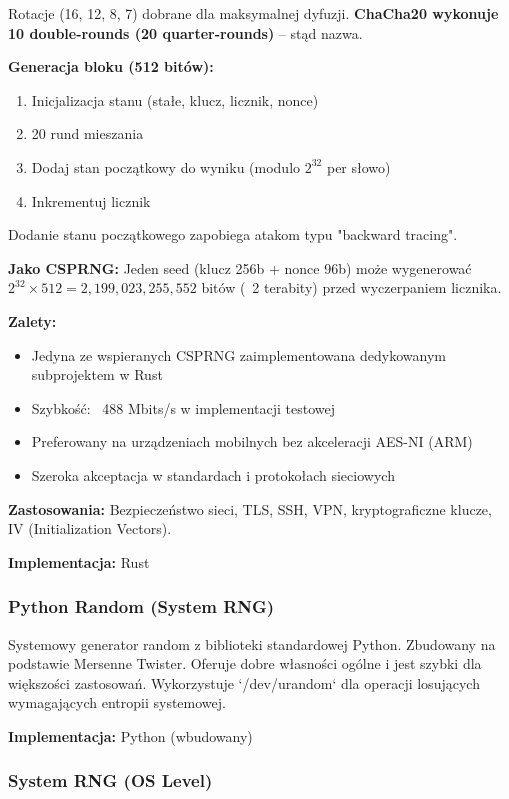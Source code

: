 \documentclass[12pt,a4paper]{article}
\begin{document}
Rotacje (16, 12, 8, 7) dobrane dla maksymalnej dyfuzji. \textbf{ChaCha20 wykonuje 10 double-rounds (20 quarter-rounds)} – stąd nazwa.

\textbf{Generacja bloku (512 bitów):}
\begin{enumerate}
    \item Inicjalizacja stanu (stałe, klucz, licznik, nonce)
    \item 20 rund mieszania
    \item Dodaj stan początkowy do wyniku (modulo $2^{32}$ per słowo)
    \item Inkrementuj licznik
\end{enumerate}

Dodanie stanu początkowego zapobiega atakom typu "backward tracing".

\textbf{Jako CSPRNG:} Jeden seed (klucz 256b + nonce 96b) może wygenerować $2^{32} \times 512 = 2{,}199{,}023{,}255{,}552$ bitów (~2 terabity) przed wyczerpaniem licznika.

\textbf{Zalety:}
\begin{itemize}
    \item Jedyna ze wspieranych CSPRNG zaimplementowana dedykowanym subprojektem w Rust
    \item Szybkość: ~488 Mbits/s w implementacji testowej
    \item Preferowany na urządzeniach mobilnych bez akceleracji AES-NI (ARM)
    \item Szeroka akceptacja w standardach i protokołach sieciowych
\end{itemize}

\textbf{Zastosowania:} Bezpieczeństwo sieci, TLS, SSH, VPN, kryptograficzne klucze, IV (Initialization Vectors).

\textbf{Implementacja:} Rust

\subsubsection{Python Random (System RNG)}

Systemowy generator random z biblioteki standardowej Python. Zbudowany na podstawie Mersenne Twister. Oferuje dobre własności ogólne i jest szybki dla większości zastosowań. Wykorzystuje `/dev/urandom` dla operacji losujących wymagających entropii systemowej.

\textbf{Implementacja:} Python (wbudowany)

\subsubsection{System RNG (OS Level)}
\end{document}
